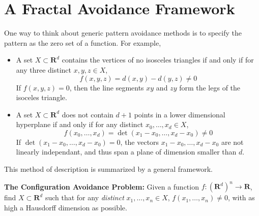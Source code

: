 \documentclass{article}
\theoremstyle{plain}
\theoremstyle{plain}
\begin{document}
\section{A Fractal Avoidance Framework}

One way to think about generic pattern avoidance methods is to specify the pattern as the zero set of a function. For example,
%
\begin{itemize}

	\item A set $X \subset \mathbf{R}^d$ contains the vertices of no isosceles triangles if and only if for any three distinct $x,y,z \in X$,
	\[ f(x,y,z) = d(x,y) - d(y,z) \neq 0 \]
	If $f(x,y,z) = 0$, then the line segments $xy$ and $zy$ form the legs of the isoceles triangle.


	\item A set $X \subset \mathbf{R}^d$ does not contain $d+1$ points in a lower dimensional hyperplane if and only if for any distinct $x_0, \dots, x_d \in X$,
	\[ f(x_0, \dots, x_d) = \det(x_1 - x_0, \dots, x_d - x_0) \neq 0 \]
	If $\det(x_1 - x_0, \dots, x_d - x_0) = 0$, the vectors $x_1 - x_0, \dots, x_d - x_0$ are not linearly independant, and thus span a plane of dimension smaller than $d$.
\end{itemize}
%
This method of description is summarized by a general framework.

\begin{changemargin}{0.5em}{0em}
{\bf The Configuration Avoidance Problem:} Given a function $f: (\mathbf{R}^d)^n \to \mathbf{R}$, find $X \subset \mathbf{R}^d$ such that for any {\it distinct} $x_1, \dots, x_n \in X$, $f(x_1, \dots, x_n) \neq 0$, with as high a Hausdorff dimension as possible.
\end{changemargin}
\end{document}
